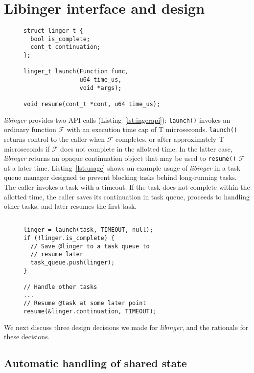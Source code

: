 \section{Libinger interface and design}

\begin{figure}
\begin{lstlisting}[label=lst:ingerapi,caption=Preemptible functions interface]
struct linger_t {
  bool is_complete;
  cont_t continuation;
};

linger_t launch(Function func,
                u64 time_us,
                void *args);

void resume(cont_t *cont, u64 time_us);
\end{lstlisting}
\end{figure}

\textit{libinger} provides two API calls (Listing~\ref{lst:ingerapi}): \texttt{launch()}
invokes an ordinary function $\mathcal{F}$ with an execution time cap of T
microseconds. \texttt{launch()} returns control to the caller when $\mathcal{F}$
completes,
or after approximately T microseconds if $\mathcal{F}$ does not complete in the
allotted time. In the latter case, \textit{libinger} returns an opaque
continuation object that may be used to \texttt{resume()} $\mathcal{F}$ at a
later time. Listing~\ref{lst:usage} shows an example usage of \textit{libinger}
in a task queue manager designed to prevent blocking tasks behind long-running
tasks. The caller invokes a task with a timeout. If the task does not complete
within the allotted time, the caller saves its continuation in task queue,
proceeds to handling other tasks, and later resumes the first task. 

\begin{figure}
\begin{lstlisting}[label=lst:usage, caption=Preemptible function usage example]

linger = launch(task, TIMEOUT, null);
if (!linger.is_complete) {
  // Save @linger to a task queue to
  // resume later
  task_queue.push(linger);
}

// Handle other tasks
...
// Resume @task at some later point
resume(&linger.continuation, TIMEOUT);

\end{lstlisting}
\end{figure}

We next discuss three design decisions we made for \textit{libinger}, and the
rationale for these decisions.

\subsection{Automatic handling of shared state}


